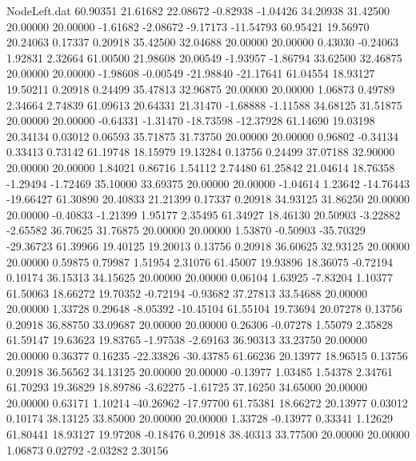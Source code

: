 \begin{filecontents}{NodeLeft.dat}
  60.90351   21.61682   22.08672    -0.82938   -1.04426   34.20938   31.42500   20.00000   20.00000   -1.61682   -2.08672   -9.17173  -11.54793
  60.95421   19.56970   20.24063     0.17337    0.20918   35.42500   32.04688   20.00000   20.00000    0.43030   -0.24063    1.92831    2.32664
  61.00500   21.98608   20.00549    -1.93957   -1.86794   33.62500   32.46875   20.00000   20.00000   -1.98608   -0.00549  -21.98840  -21.17641
  61.04554   18.93127   19.50211     0.20918    0.24499   35.47813   32.96875   20.00000   20.00000    1.06873    0.49789    2.34664    2.74839
  61.09613   20.64331   21.31470    -1.68888   -1.11588   34.68125   31.51875   20.00000   20.00000   -0.64331   -1.31470  -18.73598  -12.37928
  61.14690   19.03198   20.34134     0.03012    0.06593   35.71875   31.73750   20.00000   20.00000    0.96802   -0.34134    0.33413    0.73142
  61.19748   18.15979   19.13284     0.13756    0.24499   37.07188   32.90000   20.00000   20.00000    1.84021    0.86716    1.54112    2.74480
  61.25842   21.04614   18.76358    -1.29494   -1.72469   35.10000   33.69375   20.00000   20.00000   -1.04614    1.23642  -14.76443  -19.66427
  61.30890   20.40833   21.21399     0.17337    0.20918   34.93125   31.86250   20.00000   20.00000   -0.40833   -1.21399    1.95177    2.35495
  61.34927   18.46130   20.50903    -3.22882   -2.65582   36.70625   31.76875   20.00000   20.00000    1.53870   -0.50903  -35.70329  -29.36723
  61.39966   19.40125   19.20013     0.13756    0.20918   36.60625   32.93125   20.00000   20.00000    0.59875    0.79987    1.51954    2.31076
  61.45007   19.93896   18.36075    -0.72194    0.10174   36.15313   34.15625   20.00000   20.00000    0.06104    1.63925   -7.83204    1.10377
  61.50063   18.66272   19.70352    -0.72194   -0.93682   37.27813   33.54688   20.00000   20.00000    1.33728    0.29648   -8.05392  -10.45104
  61.55104   19.73694   20.07278     0.13756    0.20918   36.88750   33.09687   20.00000   20.00000    0.26306   -0.07278    1.55079    2.35828
  61.59147   19.63623   19.83765    -1.97538   -2.69163   36.90313   33.23750   20.00000   20.00000    0.36377    0.16235  -22.33826  -30.43785
  61.66236   20.13977   18.96515     0.13756    0.20918   36.56562   34.13125   20.00000   20.00000   -0.13977    1.03485    1.54378    2.34761
  61.70293   19.36829   18.89786    -3.62275   -1.61725   37.16250   34.65000   20.00000   20.00000    0.63171    1.10214  -40.26962  -17.97700
  61.75381   18.66272   20.13977     0.03012    0.10174   38.13125   33.85000   20.00000   20.00000    1.33728   -0.13977    0.33341    1.12629
  61.80441   18.93127   19.97208    -0.18476    0.20918   38.40313   33.77500   20.00000   20.00000    1.06873    0.02792   -2.03282    2.30156

\end{filecontents}
